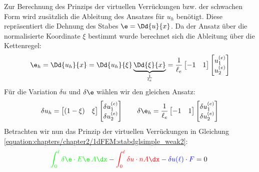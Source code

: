 \documentclass[letterpaper,10pt,german]{jupyterBook}
\begin{document}
\sphinxAtStartPar
Zur Berechnung des Prinzips der virtuellen Verrückungen bzw. der schwachen Form wird zusätzlich die Ableitung des Ansatzes für \(u_h\) benötigt. Diese repräsentiert die Dehnung des Stabes \(\e = \Dd{u}{x}\). Da der Ansatz über die normalisierte Koordinate \(\xi\) bestimmt wurde berechnet sich die Ableitung über die Kettenregel:
\begin{equation*}
\begin{split}\e_h = \Dd{u_h}{x} = \Dd{u_h}{\xi} \underbrace{\Dd{\xi}{x}}_{\frac{1}{\ell_e}} = \frac{1}{\ell_e} \begin{bmatrix} -1 & 1 \end{bmatrix} \begin{bmatrix} u_1^{(e)} \\ u_2^{(e)}\end{bmatrix} \end{split}
\end{equation*}
\sphinxAtStartPar
Für die Variation \(\delta u\) und \(\delta \e\) wählen wir den gleichen Ansatz:
\begin{equation*}
\begin{split}\delta u_h = \begin{bmatrix}  (1-\xi) & \xi \end{bmatrix} \begin{bmatrix} \delta u_1^{(e)} \\ \delta u_2^{(e)}\end{bmatrix} \qquad \delta \e_h = \frac{1}{\ell_e} \begin{bmatrix} -1 & 1 \end{bmatrix} \begin{bmatrix} \delta u_1^{(e)} \\ \delta u_2^{(e)}\end{bmatrix} \end{split}
\end{equation*}
\sphinxAtStartPar
Betrachten wir nun das Prinzip der virtuellen Verrückungen in Gleichung \eqref{equation:chapters/chapter2/1dFEM:stabdglsimple_weak2}:
\begin{equation*}
\begin{split}\begin{align}
 \textcolor{green}{\int_{0}^{\ell} \delta \e \cdot E\e \, A \dx} -\textcolor{red} {\int_0^{\ell} \delta u \cdot n A \dx} - \textcolor{blue}{\delta u(\ell) \cdot F} = 0\; 
 \end{align}\end{split}
\end{equation*}
\sphinxAtStartPar
\end{document}
